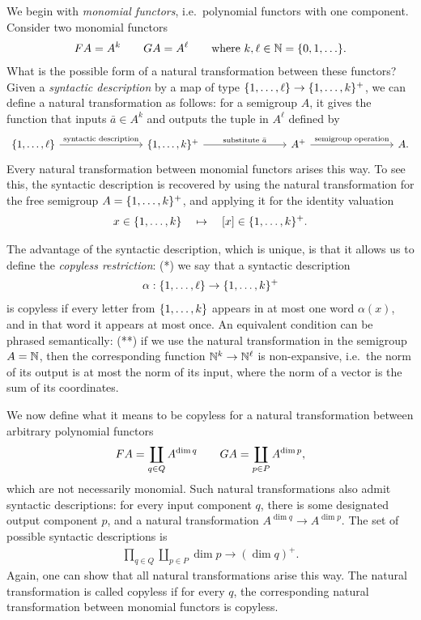 We begin with \emph{monomial functors}, i.e.~polynomial functors with one component. 
Consider two monomial functors 
\begin{align*}
\functor A = A^k \qquad 
\functorg A = A^\ell \qquad \text{where $k,\ell \in \mathbb{N} = \set{0,1,\ldots}$.}
\end{align*}
What is the possible form of a natural transformation between these functors? Given a \emph{syntactic description} by a map of type
$\{1,\ldots,\ell\} \to \{1,\ldots,k\}^+$,
we can define a natural transformation as follows: for a semigroup $A$, it gives the function  that inputs $\bar a \in A^k$ and outputs the tuple in $A^\ell$ defined by
\[
\begin{tikzcd}
    [column sep=2.8cm]
\set{1,\ldots,\ell}
\arrow[r, "\text{syntactic description}"]
&
\set{1,\ldots,k}^+ 
\ar[r,"\text{substitute $\bar a$}"]
& 
A^+
\ar[r,"\text{semigroup operation}"]
&
A.
\end{tikzcd}
\]
Every natural transformation between monomial functors arises this way. To see this, the syntactic description is recovered by using the natural transformation for the free semigroup $A=\{1,\ldots,k\}^+$, and applying it for the identity valuation 
\begin{align*}
x \in \{1,\ldots,k\} \quad \mapsto \quad [x] \in \{1,\ldots,k\}^+.
\end{align*}


The advantage of the syntactic description, which is unique, is that it allows us to define the  \emph{copyless restriction}:  (*)   we say that a  syntactic description
\begin{align*}
    \alpha: \{1,\ldots,\ell\} \to \{1,\ldots,k\}^+
    \end{align*}
is copyless if  every letter  from $\{1,\ldots,k\}$ appears in at most one word $\alpha(x)$, and in that word it appears at most once. An equivalent condition can be phrased semantically: (**) if we use the natural transformation in the semigroup $A = {\mathbb N}$, then the corresponding function ${\mathbb N}^k \to {\mathbb N}^\ell$ is non-expansive, i.e.\ the norm of its output is at most the norm of its input, where the norm of a vector is the sum of its coordinates. 

We now define what it means to be copyless for a natural transformation between arbitrary polynomial functors 
\begin{align*}
\functor A = \coprod_{q \in Q} A^{\dim q} \qquad 
\functorg A = \coprod_{p \in P} A^{\dim p},
\end{align*}
which are not necessarily monomial. Such natural transformations also admit syntactic descriptions: for every input component $q$, there is some designated output component $p$, and a natural transformation $A^{\dim q} \to A^{\dim p}$.  The set of possible syntactic descriptions is
\begin{align*}
\prod_{q \in Q} \coprod_{p \in P} \dim p \to (\dim q)^+.
\end{align*}
Again, one can show that all natural transformations arise this way. The natural transformation is called copyless if for every $q$, the corresponding natural transformation between monomial functors is copyless. 


